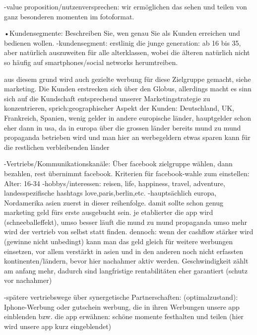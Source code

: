  -value proposition/nutzenversprechen: wir ermöglichen das sehen und teilen von ganz besonderen momenten im fotoformat.
 
 •Kundensegmente: Beschreiben Sie, wen genau Sie als Kunden erreichen und bedienen wollen.
 -kundensegment: erstlinig die junge generation: ab 16 bis 35, aber natürlich auszuweiten für alle alterklassen, wobei
 die älteren natürlich nicht so häufig auf smartphones/social networks herumtreiben. 
 
 aus diesem grund wird auch gezielte werbung für diese Zielgruppe gemacht, siehe marketing.
 Die Kunden erstrecken sich über den Globus, allerdings macht es sinn sich auf die Kundschaft entsprechend unserer Marketingstrategie zu konzentrieren,
 sprich:geographischer Aspekt der Kunden: Deutschland, UK, Frankreich, Spanien, wenig gelder in andere europische länder,
 hauptgelder schon eher dann in usa, da in europa über die grossen länder bereits mund zu mund propaganda betrieben wird 
 und man hier an werbegeldern etwas sparen kann für die restlichen verbleibenden länder
 
 -Vertriebs/Kommunikationskanäle:
 Über facebook zielgruppe wählen, dann bezahlen, rest übernimmt facebook.
 Kriterien für facebook-wahle zum einstellen:
 Alter: 16-34
 -hobbys/interessen: reisen, life, happiness, travel, adventure, landesspezifische hashtags love,paris,berlin,etc.
 -hauptsächlich europa, Nordamerika asien  zuerst in dieser reihenfolge.
 damit sollte schon genug marketing geld fürs erste ausgebucht sein.
 je etablierter die app wird (schneeballeffekt), umso besser läuft die mund zu mund propaganda
 umso mehr wird der vertrieb von selbst statt finden. dennoch: wenn der cashflow stärker wird (gewinne nicht unbedingt)
 kann man das geld gleich für weitere werbungen einsetzen, vor allem verstärkt in asien und in den anderen noch nicht erfassten 
 kontinenten/ländern, bevor hier nachahmer aktiv werden. Geschwindigkeit zählt am anfang mehr, dadurch sind langfristige rentabilitäten eher garantiert (schutz vor nachahmer)
 
 
 -spätere vertriebswege über synergetische Partnerschaften:
 (optimalzustand): Iphone-Werbung oder gutschein werbung, die in ihren Werbungen unsere app einblenden
 bzw. die app erwähnen: schöne momente festhalten und teilen (hier wird unsere app kurz eingeblendet)

